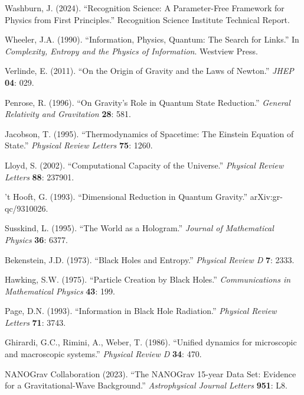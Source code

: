 \documentclass[twocolumn,prd,amsmath,amssymb,aps,superscriptaddress,nofootinbib]{revtex4-2}
\begin{document}
\begin{thebibliography}{99}

 Washburn, J. (2024). ``Recognition Science: A Parameter-Free Framework for Physics from First Principles.'' Recognition Science Institute Technical Report.

 Wheeler, J.A. (1990). ``Information, Physics, Quantum: The Search for Links.'' In \textit{Complexity, Entropy and the Physics of Information}. Westview Press.

 Verlinde, E. (2011). ``On the Origin of Gravity and the Laws of Newton.'' \textit{JHEP} \textbf{04}: 029.

 Penrose, R. (1996). ``On Gravity's Role in Quantum State Reduction.'' \textit{General Relativity and Gravitation} \textbf{28}: 581.

 Jacobson, T. (1995). ``Thermodynamics of Spacetime: The Einstein Equation of State.'' \textit{Physical Review Letters} \textbf{75}: 1260.

 Lloyd, S. (2002). ``Computational Capacity of the Universe.'' \textit{Physical Review Letters} \textbf{88}: 237901.

 't Hooft, G. (1993). ``Dimensional Reduction in Quantum Gravity.'' arXiv:gr-qc/9310026.

 Susskind, L. (1995). ``The World as a Hologram.'' \textit{Journal of Mathematical Physics} \textbf{36}: 6377.

 Bekenstein, J.D. (1973). ``Black Holes and Entropy.'' \textit{Physical Review D} \textbf{7}: 2333.

 Hawking, S.W. (1975). ``Particle Creation by Black Holes.'' \textit{Communications in Mathematical Physics} \textbf{43}: 199.

 Page, D.N. (1993). ``Information in Black Hole Radiation.'' \textit{Physical Review Letters} \textbf{71}: 3743.

 Ghirardi, G.C., Rimini, A., Weber, T. (1986). ``Unified dynamics for microscopic and macroscopic systems.'' \textit{Physical Review D} \textbf{34}: 470.

 NANOGrav Collaboration (2023). ``The NANOGrav 15-year Data Set: Evidence for a Gravitational-Wave Background.'' \textit{Astrophysical Journal Letters} \textbf{951}: L8.

\end{thebibliography}
\end{document}
